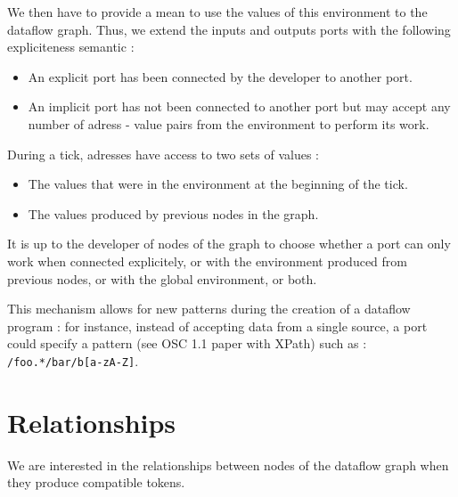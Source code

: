 \documentclass{article}
\begin{document}
    We then have to provide a mean to use the values of this environment to the dataflow graph.
    Thus, we extend the inputs and outputs ports with the following expliciteness semantic : 
    
    \begin{itemize}
        \item An explicit port has been connected by the developer to another port.
        \item An implicit port has not been connected to another port but may accept any number of adress - value pairs from the environment to perform its work.
    \end{itemize}
    
    During a tick, adresses have access to two sets of values : 
    \begin{itemize}
        \item The values that were in the environment at the beginning of the tick.
        \item The values produced by previous nodes in the graph.
    \end{itemize}

    It is up to the developer of nodes of the graph to choose whether a port can only work when connected explicitely, or with the environment produced from previous nodes, or with the global environment, or both.

    This mechanism allows for new patterns during the creation of a dataflow program : for instance, instead of accepting data from a single source, a port could specify a pattern (see OSC 1.1 paper with XPath) such as : \lstinline|/foo.*/bar/b[a-zA-Z]|. 
	
	
    
	\section{Relationships}
    We are interested in the relationships between nodes of the dataflow graph when they produce compatible tokens.
     
\end{document}
